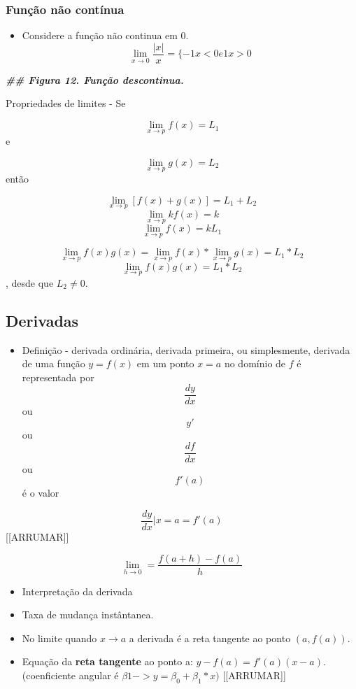 \documentclass[
]{article}
\newenvironment{Shaded}{\begin{snugshade}}{\end{snugshade}}
\newcommand{\DocumentationTok}[1]{\textcolor[rgb]{0.56,0.35,0.01}{\textbf{\textit{#1}}}}
\providecommand{\tightlist}{%
  \setlength{\itemsep}{0pt}\setlength{\parskip}{0pt}}
\begin{document}
\hypertarget{funuxe7uxe3o-nuxe3o-contuxednua}{%
\subsubsection{Função não
contínua}\label{funuxe7uxe3o-nuxe3o-contuxednua}}

\begin{itemize}
\tightlist
\item
  Considere a função não continua em 0. \[
  \lim_{x \to 0} \frac{|x|}{x} = \{-1   x < 0 e 1 x > 0
  \]
\end{itemize}

\begin{Shaded}
\begin{Highlighting}[]
\DocumentationTok{\#\# Figura 12. Função descontinua.}
\end{Highlighting}
\end{Shaded}

Propriedades de limites - Se

\[\lim_{x \to p} f(x) = L_1\] e

\[\lim_{x \to p} g(x) = L_2\] então

\[\lim_{x \to p} [f(x) + g(x)] = L_1 + L_2\]
\[\lim_{x \to p} k f(x) = k\] \[\lim_{x \to p} f(x) = k L_1\]

\[\lim_{x \to p} f(x) g(x) = \lim_{x \to p} f(x) * \lim_{x \to p} g(x) = L_1 * L_2\]
\[\lim_{x \to p} f(x) g(x) = L_1 * L_2\] , desde que \(L_2 \neq 0\).

\hypertarget{derivadas}{%
\subsection{Derivadas}\label{derivadas}}

\begin{itemize}
\tightlist
\item
  Definição - derivada ordinária, derivada primeira, ou simplesmente,
  derivada de uma função \(y = f(x)\) em um ponto \(x = a\) no domínio
  de \(f\) é representada por \[\frac{dy}{dx}\] ou \[y′\] ou
  \[\frac{df}{dx}\] ou \[f′(a)\] é o valor
\end{itemize}

\[ \frac{dy}{dx} | x=a = f′(a)\] {[}{[}ARRUMAR{]}{]}

\[
\lim_{h \to 0}  = \frac{f(a+h)-f(a)}h
\]

\begin{itemize}
\tightlist
\item
  Interpretação da derivada
\item
  Taxa de mudança instântanea.
\item
  No limite quando \(x \longrightarrow a\) a derivada é a reta tangente
  ao ponto \((a, f(a))\).
\item
  Equação da \textbf{reta tangente} ao ponto a:
  \(y - f(a) = f′(a)(x - a)\).(coenficiente angular é
  \(\beta 1 -> y = \beta_0 + \beta_1*x)\) {[}{[}ARRUMAR{]}{]}
\end{itemize}
\end{document}
